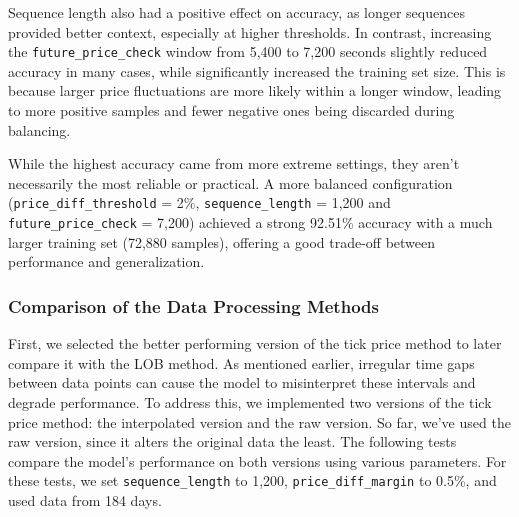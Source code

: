 \documentclass[a4paper,oneside,onecolumn,12pt]{book}
\begin{document}
		Sequence length also had a positive effect on accuracy, as longer sequences provided better context, especially at higher thresholds. In contrast, increasing the \texttt{future\_price\_check} window from 5,400 to 7,200 seconds slightly reduced accuracy in many cases, while significantly increased the training set size. This is because larger price fluctuations are more likely within a longer window, leading to more positive samples and fewer negative ones being discarded during balancing.

		While the highest accuracy came from more extreme settings, they aren't necessarily the most reliable or practical. A more balanced configuration (\texttt{price\_diff\_threshold} = 2\%, \texttt{sequence\_length} = 1,200 and \texttt{future\_price\_check} = 7,200) achieved a strong 92.51\% accuracy with a much larger training set (72,880 samples), offering a good trade-off between performance and generalization.

		\subsubsection{Comparison of the Data Processing Methods}
		First, we selected the better performing version of the tick price method to later compare it with the LOB method. As mentioned earlier, irregular time gaps between data points can cause the model to misinterpret these intervals and degrade performance. To address this, we implemented two versions of the tick price method: the interpolated version and the raw version. So far, we've used the raw version, since it alters the original data the least. The following tests compare the model's performance on both versions using various parameters. For these tests, we set \texttt{sequence\_length} to 1,200, \texttt{price\_diff\_margin} to 0.5\%, and used data from 184 days.
\end{document}
